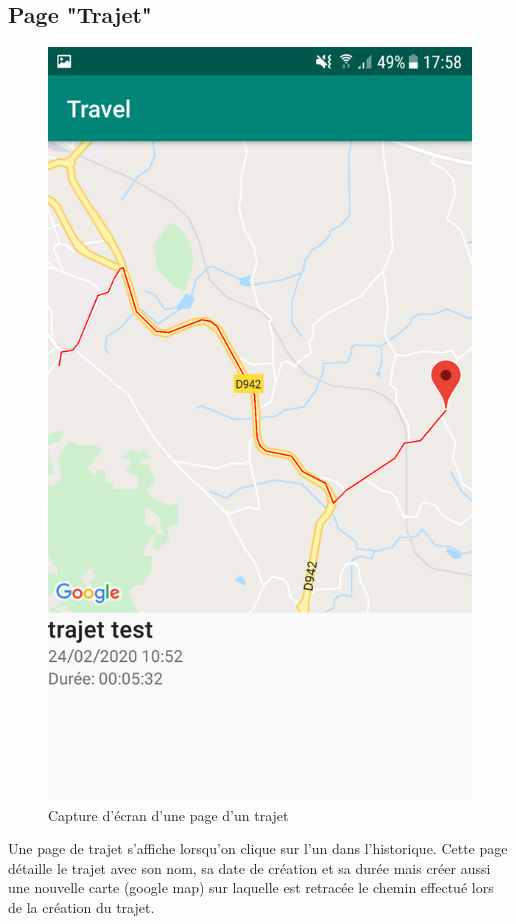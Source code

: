 \subsection{Page "Trajet"}
\begin{figure}
  \vspace{-50pt}
  \label{Trajet}
  \centering
  \includegraphics[scale=0.13]{images/travel.png}
  \caption{Capture d'écran d'une page d'un trajet}
\end{figure}
Une page de trajet s'affiche lorsqu'on clique sur l'un dans l'historique. Cette page détaille le trajet avec son nom, sa date de création et
sa durée mais créer aussi une nouvelle carte (google map) sur laquelle est retracée le chemin effectué lors de la création du trajet.

